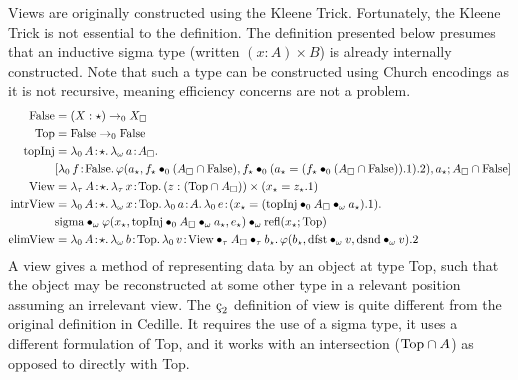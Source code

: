 Views are originally constructed using the Kleene Trick.
Fortunately, the Kleene Trick is not essential to the definition.
The definition presented below presumes that an inductive sigma type (written $(x : A) \times B$) is already internally constructed.
Note that such a type can be constructed using Church encodings as it is not recursive, meaning efficiency concerns are not a problem.
\begin{align*}
    \pFalse &= (X:\star) \to_0 X_\square \\
    \pTop &= \pFalse \to_0 \pFalse \\
    \ptopInj &= \abs{\lambda_0}{A}{\star}{
        \abs{\lambda_\omega}{a}{A_\square}{
            \\ &[
                \abs{\lambda_0}{f}{\pFalse}{
                    \varphi(a_\star,
                        \app{f_\star}{0}{(A_\square \cap \pFalse)},
                        \app{f_\star}{0}{(a_\star = (\app{f_\star}{0}{(A_\square \cap \pFalse)}).1 )}.2 )
                },
                a_\star;
                A_\square \cap \pFalse
            ]
        }
    } \\
    \pView &= \abs{\lambda_\tau}{A}{\star}{
        \abs{\lambda_\tau}{x}{\pTop}{
            (z : (\pTop \cap A_\square)) \times (x_\star = z_\star.1)
        }
    } \\
    \pintrView &= \abs{\lambda_0}{A}{\star}{
        \abs{\lambda_\omega}{x}{\pTop}{
            \abs{\lambda_0}{a}{A}{
                \abs{\lambda_0}{e}{(x_\star = (\apptwo{\ptopInj}{0}{A_\square}{\omega}{a_\star}).1)}{
                    \\ &\apptwo{\psigma}
                        {\omega}{\varphi(x_\star, \apptwo{\ptopInj}{0}{A_\square}{\omega}{a_\star}, e_\star)}
                        {\omega}{\prefl(x_\star; \pTop)}
                }
            }
        }
    } \\
    \pelimView &= \abs{\lambda_0}{A}{\star}{
        \abs{\lambda_\omega}{b}{\pTop}{
            \abs{\lambda_0}{v}{\apptwo{\pView}{\tau}{A_\square}{\tau}{b_\star}}{
                \varphi(b_\star, \app{\pdfst}{\omega}{v}, \app{\pdsnd}{\omega}{v}).2
            }
        }
    }
\end{align*}
A view gives a method of representing data by an object at type Top, such that the object may be reconstructed at some other type in a relevant position assuming an irrelevant view.
The $\ced$ definition of view is quite different from the original definition in Cedille.
It requires the use of a sigma type, it uses a different formulation of Top, and it works with an intersection ($\textnormal{Top} \cap A$) as opposed to directly with Top.

